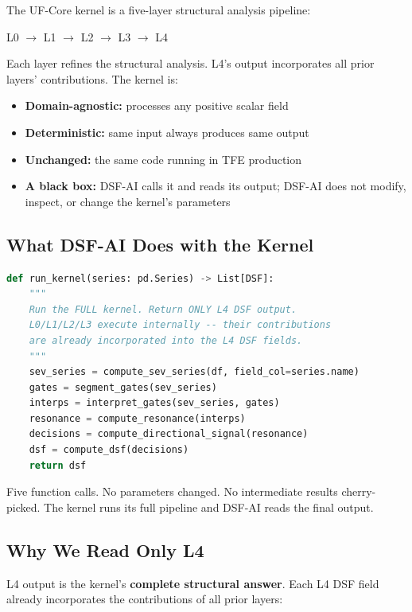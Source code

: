 \documentclass[11pt,a4paper]{article}
\begin{document}
The UF-Core kernel is a five-layer structural analysis pipeline:

\begin{center}
L0 $\rightarrow$ L1 $\rightarrow$ L2 $\rightarrow$ L3 $\rightarrow$ L4
\end{center}

Each layer refines the structural analysis. L4's output incorporates
all prior layers' contributions. The kernel is:

\begin{itemize}[nosep]
\item \textbf{Domain-agnostic:} processes any positive scalar field
\item \textbf{Deterministic:} same input always produces same output
\item \textbf{Unchanged:} the same code running in TFE production
\item \textbf{A black box:} DSF-AI calls it and reads its output;
      DSF-AI does not modify, inspect, or change the kernel's
      parameters
\end{itemize}

\subsection{What DSF-AI Does with the Kernel}

\begin{lstlisting}[language=Python]
def run_kernel(series: pd.Series) -> List[DSF]:
    """
    Run the FULL kernel. Return ONLY L4 DSF output.
    L0/L1/L2/L3 execute internally -- their contributions
    are already incorporated into the L4 DSF fields.
    """
    sev_series = compute_sev_series(df, field_col=series.name)
    gates = segment_gates(sev_series)
    interps = interpret_gates(sev_series, gates)
    resonance = compute_resonance(interps)
    decisions = compute_directional_signal(resonance)
    dsf = compute_dsf(decisions)
    return dsf
\end{lstlisting}

Five function calls. No parameters changed. No intermediate results
cherry-picked. The kernel runs its full pipeline and DSF-AI reads
the final output.

\subsection{Why We Read Only L4}

L4 output is the kernel's \textbf{complete structural answer}. Each
L4 DSF field already incorporates the contributions of all prior
layers:
\end{document}
